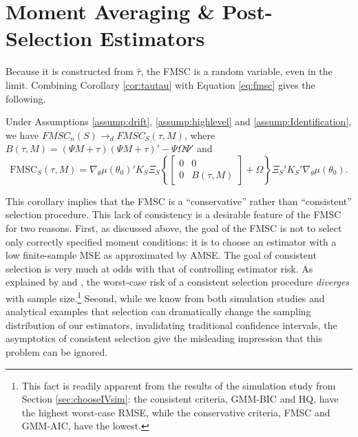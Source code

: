 \section{Moment Averaging \& Post-Selection Estimators}
\label{sec:avg}
Because it is constructed from $\widehat{\tau}$, the FMSC is a random variable, even in the limit.
Combining Corollary \ref{cor:tautau} with Equation \ref{eq:fmsc} gives the following.
\begin{cor}
\label{cor:FMSClimit}
	Under Assumptions \ref{assump:drift}, \ref{assump:highlevel} and \ref{assump:Identification}, we have $FMSC_n(S) \rightarrow_d FMSC_S(\tau, M)$, where
		$B(\tau,M) = (\Psi M + \tau)(\Psi M + \tau)' - \Psi \Omega \Psi'$ and 
	\begin{equation*}
		\mbox{FMSC}_S(\tau,M) = \nabla_\theta\mu(\theta_0)'K_S\Xi_S \left\{\left[\begin{array}{cc}0&0\\0& B(\tau,M) \end{array}\right] + \Omega\right\}\Xi_S'K_S'\nabla_\theta\mu(\theta_0).
	\end{equation*}
\end{cor}
This corollary implies that the FMSC is a ``conservative'' rather than ``consistent'' selection procedure.
This lack of consistency is a desirable feature of the FMSC for two reasons.
First, as discussed above, the goal of the FMSC is not to select only correctly specified moment conditions: it is to choose an estimator with a low finite-sample MSE as approximated by AMSE.
The goal of consistent selection is very much at odds with that of controlling estimator risk.
As explained by \cite{Yang2005} and \cite{LeebPoetscher2008}, the worst-case risk of a consistent selection procedure \emph{diverges} with sample size.\footnote{This fact is readily apparent from the results of the simulation study from Section \ref{sec:chooseIVsim}: the consistent criteria, GMM-BIC and HQ, have the highest worst-case RMSE, while the conservative criteria, FMSC and GMM-AIC, have the lowest.}
Second, while we know from both simulation studies \citep{Demetrescu} and analytical examples \citep{LeebPoetscher2005} that selection can dramatically change the sampling distribution of our estimators, invalidating traditional confidence intervals, the asymptotics of consistent selection give the misleading impression that this problem can be ignored.


